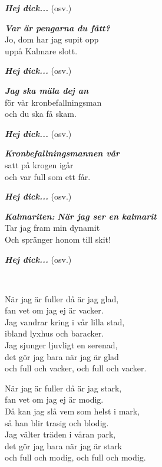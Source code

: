 \textbf{\textit{Hej dick...}} (osv.)

\leftrepeat \textbf{\textit{Var är pengarna du fått?}}\\
Jo, dom har jag supit opp \rightrepeat\\
uppå Kalmare slott.

\textbf{\textit{Hej dick...}} (osv.)

\leftrepeat \textbf{\textit{Jag ska mäla dej an}}\\
för vår kronbefallningsman \rightrepeat\\
och du ska få skam.

\textbf{\textit{Hej dick...}} (osv.)

\leftrepeat \textbf{\textit{Kronbefallningsmannen vår}}\\
satt på krogen igår \rightrepeat\\
och var full som ett får.

\textbf{\textit{Hej dick...}} (osv.)


\textbf{\textit{{Kalmariten: }}}
\leftrepeat \textbf{\textit{När jag ser en kalmarit}}\\
Tar jag fram min dynamit \rightrepeat\\
Och spränger honom till skit!

\textbf{\textit{Hej dick...}} (osv.)



\newpage

 \\       

\songtext{}När jag är fuller då är jag glad,\\
fan vet om jag ej är vacker.\\
Jag vandrar kring i vår lilla stad,\\
ibland lyxhus och baracker.\\
Jag sjunger ljuvligt en serenad,\\
det gör jag bara när jag är glad\\
och full och vacker, och full och vacker.

När jag är fuller då är jag stark,\\
fan vet om jag ej är modig.\\
Då kan jag slå vem som helst i mark,\\
så han blir trasig och blodig.\\
Jag välter träden i våran park,\\
det gör jag bara när jag är stark\\
och full och modig, och full och modig.

